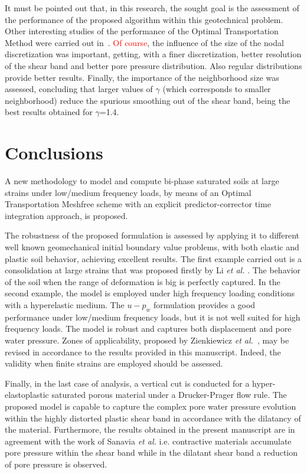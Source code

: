 \documentclass[twocolumn]{svjour3}          %
\begin{document}
It must be pointed out that, in this research, the sought goal is the assessment of the performance of the proposed algorithm within this geotechnical problem. Other interesting studies of the performance of the Optimal Transportation Method were carried out in~\cite{Navas:17b}. \textcolor{red}{Of course}, the influence of the size of the nodal discretization was important, getting, with a finer discretization, better resolution of the shear band and better pore pressure distribution. Also regular distributions provide better results. Finally, the importance of the neighborhood size was assessed, concluding that larger values of $\gamma$ (which corresponds to smaller neighborhood) reduce the spurious smoothing out of the shear band, being the best results obtained for $\gamma$=1.4.

\section{Conclusions}
\label{sec:6}
A new methodology to model and compute bi-phase saturated soils at large strains under low/medium frequency loads, by means of an Optimal Transportation Meshfree scheme with an explicit predictor-corrector time integration approach, is proposed.

The robustness of the proposed formulation is assessed by applying it to different well known geomechanical initial boundary value problems, with both elastic and plastic soil behavior, achieving excellent results. The first example carried out is a consolidation at large strains that was proposed firstly by Li \textit{et al.} \cite{LiBorja2004}. The behavior of the soil when the range of deformation is big is perfectly captured. In the second example, the model is employed under high frequency loading conditions with a hyperelastic medium. The $u-p_w$ formulation provides a good performance under low/medium frequency loads, but it is not well suited for high frequency loads. The model is robust and captures both displacement and pore water pressure. Zones of applicability, proposed by Zienkiewicz \textit{et al.}~\cite{zienkiewicz1980}, may be revised in accordance to the results provided in this manuscript. Indeed, the validity when finite strains are employed should be assessed.

Finally, in the last case of analysis, a vertical cut is conducted for a hyper-elastoplastic saturated porous material under a Drucker-Prager flow rule. The proposed model is capable to capture the complex pore water pressure evolution within the highly distorted plastic shear band in accordance with the dilatancy of the  material. Furthermore, the results obtained in the present manuscript are in agreement with the work of Sanavia \textit{et al.}\cite{Sanavia:02b} i.e. contractive materials accumulate pore pressure within the shear band  while  in  the  dilatant  shear  band  a  reduction of pore pressure is observed.
\end{document}
